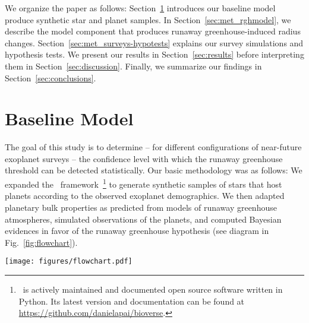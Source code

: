 \documentclass[twocolumn,twocolappendix]{aastex631}
\begin{document}
We organize the paper as follows:
Section~\ref{sec:met_baseline} introduces our baseline model produce synthetic star and planet samples.
In Section~\ref{sec:met_rghmodel}, we describe the model component that produces runaway greenhouse-induced radius changes.
Section~\ref{sec:met_surveys-hypotests} explains our survey simulations and hypothesis tests.
We present our results in Section~\ref{sec:results} before interpreting them in Section~\ref{sec:discussion}.
Finally, we summarize our findings in Section~\ref{sec:conclusions}.


\section{Baseline Model}\label{sec:met_baseline}
The goal of this study is to determine -- for different configurations of near-future exoplanet surveys -- the confidence level with which the runaway greenhouse threshold can be detected statistically. %
Our basic methodology was as follows:
We expanded the \bioverse\ framework~\citep{Bixel2020,Bixel2021}\footnote{\bioverse\ is actively maintained and documented open source software written in Python. Its latest version and documentation can be found at \url{https://github.com/danielapai/bioverse}.} to generate synthetic samples of stars that host planets according to the observed exoplanet demographics.
We then adapted planetary bulk properties as predicted from models of runaway greenhouse atmospheres, simulated observations of the planets, and computed Bayesian evidences in favor of the runaway greenhouse hypothesis (see diagram in Fig.~\ref{fig:flowchart}).
\begin{figure*}
    \begin{centering}
        \texttt{[image: figures/flowchart.pdf]}
        \caption{Workflow of our hypothesis testing with \bioverse. First, we generate a sample of stars and populate them with planets based on \kepler\ demographics.
            A fraction of them are then assigned a runaway greenhouse climate based on the model described in Sect.~\ref{sec:met_rghmodel}.
        We then simulate an exoplanet survey, whereby selection effects and detection biases are introduced. Finally, we test the runaway greenhouse hypothesis based on data from the survey simulation.
        By iterating through these steps, we compute the statistical power of testing the hypothesis for different survey designs.}
        \label{fig:flowchart}
    \end{centering}
\end{figure*}
\end{document}

